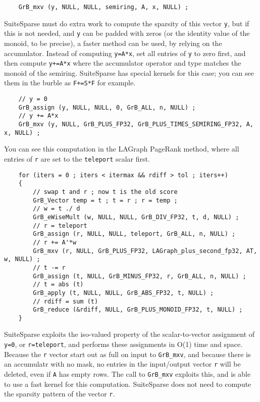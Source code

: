 \documentclass[12pt]{article}
\begin{document}
    {\scriptsize
    \begin{verbatim}
    GrB_mxv (y, NULL, NULL, semiring, A, x, NULL) ; \end{verbatim}}

SuiteSparse must do extra work to compute the sparsity of this vector \verb'y',
but if this is not needed, and \verb'y' can be padded with zeros (or 
the identity value of the monoid, to be precise), a faster method can be used,
by relying on the accumulator.  Instead of computing \verb'y=A*x', set all
entries of \verb'y' to zero first, and then compute \verb'y+=A*x' where the
accumulator operator and type matches the monoid of the semiring.  SuiteSparse
has special kernels for this case; you can see them in the burble as
\verb'F+=S*F' for example.

    {\scriptsize
    \begin{verbatim}
    // y = 0
    GrB_assign (y, NULL, NULL, 0, GrB_ALL, n, NULL) ;
    // y += A*x
    GrB_mxv (y, NULL, GrB_PLUS_FP32, GrB_PLUS_TIMES_SEMIRING_FP32, A, x, NULL) ; \end{verbatim}}

You can see this computation in the LAGraph PageRank method, where all
entries of \verb'r' are set to the \verb'teleport' scalar first.

    {\scriptsize
    \begin{verbatim}
    for (iters = 0 ; iters < itermax && rdiff > tol ; iters++)
    {
        // swap t and r ; now t is the old score
        GrB_Vector temp = t ; t = r ; r = temp ;
        // w = t ./ d
        GrB_eWiseMult (w, NULL, NULL, GrB_DIV_FP32, t, d, NULL) ;
        // r = teleport
        GrB_assign (r, NULL, NULL, teleport, GrB_ALL, n, NULL) ;
        // r += A'*w
        GrB_mxv (r, NULL, GrB_PLUS_FP32, LAGraph_plus_second_fp32, AT, w, NULL) ;
        // t -= r
        GrB_assign (t, NULL, GrB_MINUS_FP32, r, GrB_ALL, n, NULL) ;
        // t = abs (t)
        GrB_apply (t, NULL, NULL, GrB_ABS_FP32, t, NULL) ;
        // rdiff = sum (t)
        GrB_reduce (&rdiff, NULL, GrB_PLUS_MONOID_FP32, t, NULL) ;
    } \end{verbatim}}

SuiteSparse exploits the iso-valued property of the scalar-to-vector assignment
of \verb'y=0', or \verb'r=teleport', and performs these assignments in O(1)
time and space.  Because the \verb'r' vector start out as full on input to
\verb'GrB_mxv', and because there is an accumulatr with no mask, no entries in
the input/output vector \verb'r' will be deleted, even if \verb'A' has empty
rows.  The call to \verb'GrB_mxv' exploits this, and is able to use a fast
kernel for this computation.  SuiteSparse does not need to compute the sparsity
pattern of the vector \verb'r'.
\end{document}

